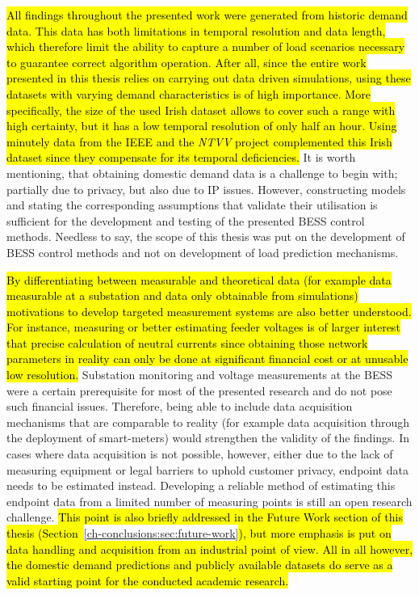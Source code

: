 \hl{All findings throughout the presented work were generated from historic demand data.
This data has both limitations in temporal resolution and data length, which therefore limit the ability to capture a number of load scenarios necessary to guarantee correct algorithm operation.
After all, since the entire work presented in this thesis relies on carrying out data driven simulations, using these datasets with varying demand characteristics is of high importance.
More specifically, the size of the used Irish dataset allows to cover such a range with high certainty, but it has a low temporal resolution of only half an hour.
Using minutely data from the IEEE and the \textit{NTVV} project complemented this Irish dataset since they compensate for its temporal deficiencies.}
It is worth mentioning, that obtaining domestic demand data is a challenge to begin with; partially due to privacy, but also due to IP issues.
However, constructing models and stating the corresponding assumptions that validate their utilisation is sufficient for the development and testing of the presented BESS control methods.
Needless to say, the scope of this thesis was put on the development of BESS control methods and not on development of load prediction mechanisms.

\hl{By differentiating between measurable and theoretical data (for example data measurable at a substation and data only obtainable from simulations) motivations to develop targeted measurement systems are also better understood.
For instance, measuring or better estimating feeder voltages is of larger interest that precise calculation of neutral currents since obtaining those network parameters in reality can only be done at significant financial cost or at unusable low resolution.}
Substation monitoring and voltage measurements at the BESS were a certain prerequisite for most of the presented research and do not pose such financial issues.
Therefore, being able to include data acquisition mechanisms that are comparable to reality (for example data acquisition through the deployment of smart-meters) would strengthen the validity of the findings.
In cases where data acquisition is not possible, however, either due to the lack of measuring equipment or legal barriers to uphold customer privacy, endpoint data needs to be estimated instead.
Developing a reliable method of estimating this endpoint data from a limited number of measuring points is still an open research challenge.
\hl{This point is also briefly addressed in the Future Work section of this thesis (Section~}\ref{ch-conclusions:sec:future-work}\hl{), but more emphasis is put on data handling and acquisition from an industrial point of view.
All in all however, the domestic demand predictions and publicly available datasets do serve as a valid starting point for the conducted academic research.}

